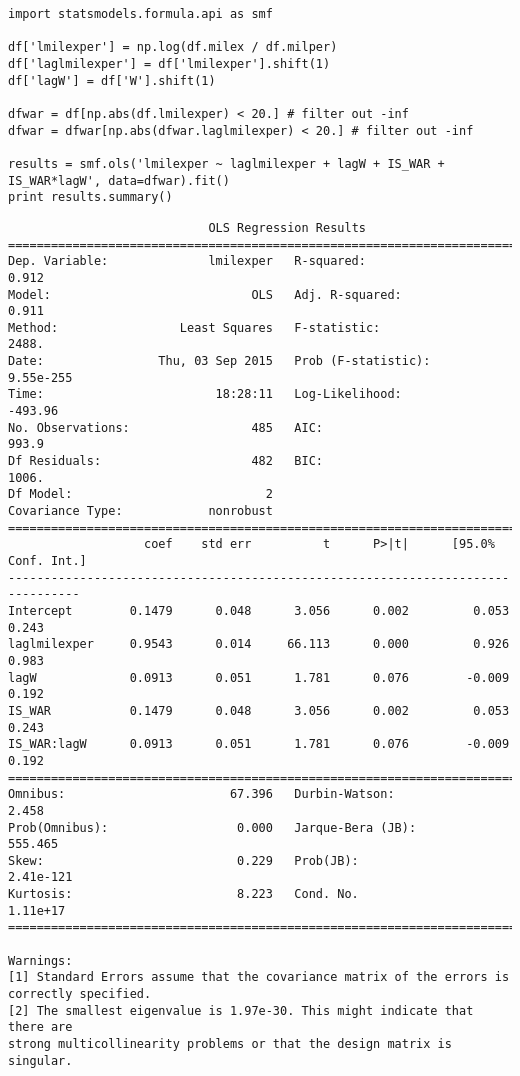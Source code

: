 \documentclass[12pt,fleqn]{article}\usepackage{common}
\begin{document}
\begin{verbatim}
import statsmodels.formula.api as smf

df['lmilexper'] = np.log(df.milex / df.milper)
df['laglmilexper'] = df['lmilexper'].shift(1)
df['lagW'] = df['W'].shift(1)

dfwar = df[np.abs(df.lmilexper) < 20.] # filter out -inf
dfwar = dfwar[np.abs(dfwar.laglmilexper) < 20.] # filter out -inf

results = smf.ols('lmilexper ~ laglmilexper + lagW + IS_WAR + IS_WAR*lagW', data=dfwar).fit()
print results.summary()
\end{verbatim}

\begin{verbatim}
                            OLS Regression Results                            
==============================================================================
Dep. Variable:              lmilexper   R-squared:                       0.912
Model:                            OLS   Adj. R-squared:                  0.911
Method:                 Least Squares   F-statistic:                     2488.
Date:                Thu, 03 Sep 2015   Prob (F-statistic):          9.55e-255
Time:                        18:28:11   Log-Likelihood:                -493.96
No. Observations:                 485   AIC:                             993.9
Df Residuals:                     482   BIC:                             1006.
Df Model:                           2                                         
Covariance Type:            nonrobust                                         
================================================================================
                   coef    std err          t      P>|t|      [95.0% Conf. Int.]
--------------------------------------------------------------------------------
Intercept        0.1479      0.048      3.056      0.002         0.053     0.243
laglmilexper     0.9543      0.014     66.113      0.000         0.926     0.983
lagW             0.0913      0.051      1.781      0.076        -0.009     0.192
IS_WAR           0.1479      0.048      3.056      0.002         0.053     0.243
IS_WAR:lagW      0.0913      0.051      1.781      0.076        -0.009     0.192
==============================================================================
Omnibus:                       67.396   Durbin-Watson:                   2.458
Prob(Omnibus):                  0.000   Jarque-Bera (JB):              555.465
Skew:                           0.229   Prob(JB):                    2.41e-121
Kurtosis:                       8.223   Cond. No.                     1.11e+17
==============================================================================

Warnings:
[1] Standard Errors assume that the covariance matrix of the errors is correctly specified.
[2] The smallest eigenvalue is 1.97e-30. This might indicate that there are
strong multicollinearity problems or that the design matrix is singular.
\end{verbatim}
\end{document}

